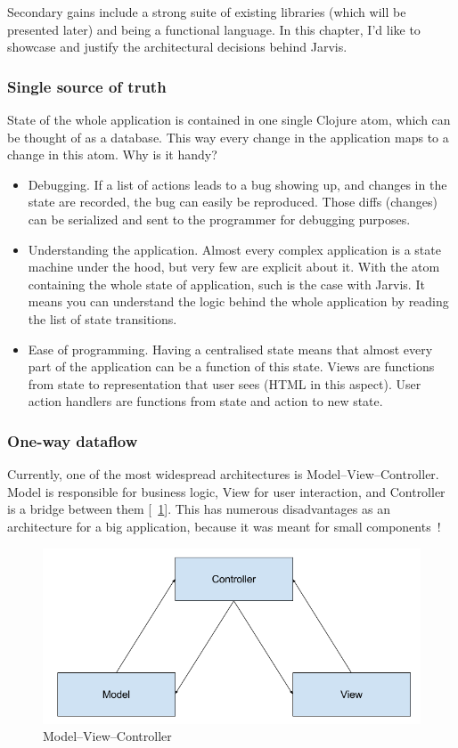 \documentclass[english,mgr,shortabstract]{iithesis}
\newcommand*{\figref}[1]{[\textbf{\figurename}~\ref{#1}]}
\begin{document}
Secondary gains include a strong suite of existing libraries (which will be
presented later) and being a functional language.
In this chapter, I’d like to showcase and justify the architectural decisions
behind Jarvis.

\subsubsection{Single source of truth}
State of the whole application is contained in one single Clojure atom, which
can be thought of as a database.
This way every change in the application maps to a change in this atom.
Why is it handy?
\begin{itemize}
\item Debugging. If a list of actions leads to a bug showing up, and changes in
  the state are recorded, the bug can easily be reproduced. Those diffs
  (changes) can be serialized and sent to the programmer for debugging purposes.
\item Understanding the application. Almost every complex application is a state
  machine under the hood, but very few are explicit about it. With the atom
  containing the whole state of application, such is the case with Jarvis. It
  means you can understand the logic behind the whole application by reading the
  list of state transitions.
\item Ease of programming. Having a centralised state
  means that almost every part of the application can be a function of this
  state. Views are functions from state to representation that user sees (HTML
  in this aspect). User action handlers are functions from state and action to
  new state.
\end{itemize}

\subsubsection{One-way dataflow}
Currently, one of the most widespread architectures is Model--View--Controller.
Model is responsible for business logic, View for user interaction, and
Controller is a bridge between them \figref{fig:mvc}.
This has numerous disadvantages as an architecture for a big application,
because it was meant for small components~\cite{Krasner:1988:CUM:50757.50759}!

\begin{figure}[hbt]
  \centering
  \includegraphics[scale=0.3]{img/MVC}
  \caption{Model--View--Controller}
\label{fig:mvc}
\end{figure}
\end{document}

